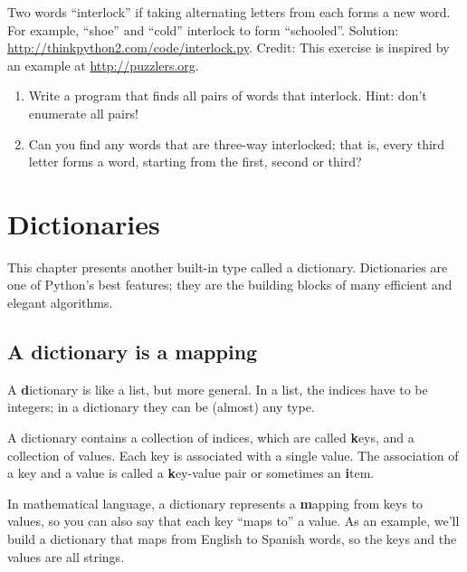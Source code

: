\documentclass[
DIV=11,
fontsize=12,
twoside,
headinclude=false,
titlepage=firstiscover,
abstract=true,
headsepline=true,
footsepline=true,
chapterprefix=true, %
headings=big,
bibliography=totoc,%
captions=tableheading
]{scrbook}
\theoremstyle{definition}
\begin{document}
\begin{exercise}
\normalfont
{}

Two words ``interlock'' if taking alternating letters from each forms
a new word.  For example, ``shoe'' and ``cold''
interlock to form ``schooled''.
Solution: \url{http://thinkpython2.com/code/interlock.py}.
Credit: This exercise is inspired by an example at \url{http://puzzlers.org}.

\begin{enumerate}

\item Write a program that finds all pairs of words that interlock.
  Hint: don't enumerate all pairs!

\item Can you find any words that are three-way interlocked; that is,
  every third letter forms a word, starting from the first, second or
  third?

\end{enumerate}
\end{exercise}


\chapter{Dictionaries}

This chapter presents another built-in type called a dictionary.
Dictionaries are one of Python's best features; they are the
building blocks of many efficient and elegant algorithms.


\section{A dictionary is a mapping}

A {\textbf dictionary} is like a list, but more general.  In a list,
the indices have to be integers; in a dictionary they can
be (almost) any type.

A dictionary contains a collection of indices, which are called {\textbf
  keys}, and a collection of values.  Each key is associated with a
single value.  The association of a key and a value is called a {\textbf
  key-value pair} or sometimes an {\textbf item}.  

In mathematical language, a dictionary represents a {\textbf mapping}
from keys to values, so you can also say that each key
``maps to'' a value.
As an example, we'll build a dictionary that maps from English
to Spanish words, so the keys and the values are all strings.
\end{document}
